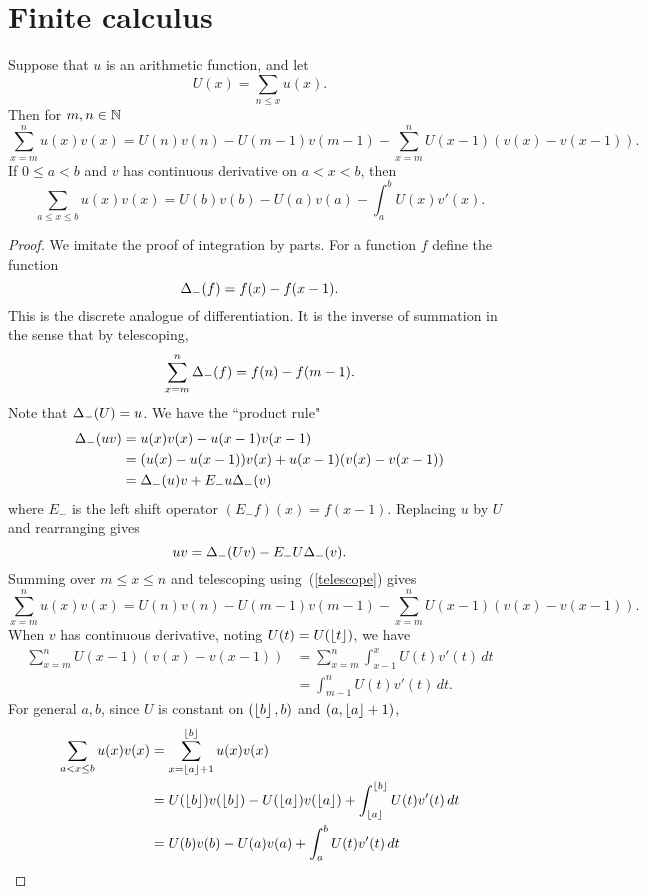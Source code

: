 \section{Finite calculus}
\begin{thm}
Suppose that $u$ is an arithmetic function, and let
\[
U(x)=\sum_{n\le x} u(x).
\]
Then for $m,n\in \mathbb{N}$ %
\[
\sum_{x=m}^n u(x)v(x)=U(n)v(n)-U(m-1)v(m-1) -\sum_{x=m}^n
U(x-1)(v(x)-v(x-1)).
\]
If $0\le a<b$ and $v$ has continuous derivative on $a<x<b$, then
\[
\sum_{a\le x\le b} u(x)v(x)=U(b)v(b)-U(a)v(a) -\int_{a}^b U(x)v'(x).
\]
\end{thm}
\begin{proof}
We imitate the proof of integration by parts. For a function $f$ define the function
\[
\Delta_-(f)=f(x)-f(x-1).
\]
This is the discrete analogue of differentiation. It is the inverse of summation in the sense that by telescoping,
\begin{equation}\label{telescope}
\sum_{x=m}^n\Delta_-(f)=f(n)-f(m-1).
\end{equation}
Note that $\Delta_-(U)=u$. 
We have the ``product rule"
\begin{align*}
\Delta_-(uv)&=u(x)v(x)-u(x-1)v(x-1)\\
&=(u(x)-u(x-1))v(x)+u(x-1)(v(x)-v(x-1))\\
&=\Delta_-(u)v+E_-u\Delta_-(v)
\end{align*}
where $E_-$ is the left shift operator $(E_-f)(x)=f(x-1)$. 
Replacing $u$ by $U$ and rearranging gives
\[
uv=\Delta_-(Uv)-E_-U\Delta_-(v).
\]
Summing over $m\le x\le n$ and telescoping using~(\ref{telescope}) gives
\[
\sum_{x=m}^n u(x)v(x)=U(n)v(n)-U(m-1)v(m-1) -\sum_{x=m}^n
U(x-1)(v(x)-v(x-1)).
\]
When $v$ has continuous derivative, noting $U(t)=U(\left\lfloor {t}\right\rfloor)$, we have
\begin{align*}
\sum_{x=m}^n
U(x-1)(v(x)-v(x-1))
&=\sum_{x=m}^n \int_{x-1}^{x}U(t)v'(t)\,dt\\
&=\int_{m-1}^n U(t)v'(t)\,dt.
\end{align*}
For general $a,b$, since $U$ is constant on $(\left\lfloor {b}\right\rfloor,b)$ and $(a,\left\lfloor {a}\right\rfloor+1)$,
\begin{align*}
\sum_{a<x\le b} u(x)v(x)
&=\sum_{x=\left\lfloor {a}\right\rfloor+1}^{\left\lfloor {b}\right\rfloor} u(x)v(x)\\
&=U(\left\lfloor {b}\right\rfloor)v(\left\lfloor {b}\right\rfloor) - U(\left\lfloor {a}\right\rfloor) v(\left\lfloor {a}\right\rfloor) +\int_{\left\lfloor {a}\right\rfloor}^{\left\lfloor {b}\right\rfloor} U(t)v'(t)\,dt\\
&=U(b)v(b) - U(a) v(a) +\int_{a}^{b} U(t)v'(t)\,dt\qedhere
\end{align*}
\end{proof}




%



\printindex

